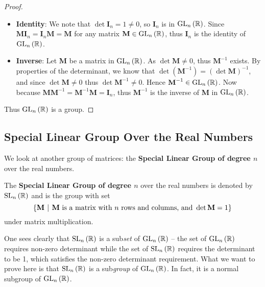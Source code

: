 \begin{proof}
\begin{itemize}
        \item \textbf{Identity}: We note that $\det \textbf{I}_n = 1 \neq 0$, so $\textbf{I}_n$ is in $\mathrm{GL}_{n}\left(\mathbb{R}\right)$. Since $\textbf{MI}_n = \textbf{I}_n\textbf{M} = \textbf{M}$ for any matrix $\textbf{M} \in \mathrm{GL}_{n}\left(\mathbb{R}\right)$, thus $\textbf{I}_n$ is the identity of $\mathrm{GL}_{n}\left(\mathbb{R}\right)$.

        \item \textbf{Inverse}: Let \textbf{M} be a matrix in $\mathrm{GL}_{n}\left(\mathbb{R}\right)$. As $\det \textbf{M} \neq 0$, thus $\textbf{M}^{-1}$ exists. By properties of the determinant, we know that $\det \left(\textbf{M}^{-1}\right) = \left(\det \textbf{M}\right)^{-1}$, and since $\det \textbf{M} \neq 0$ thus $\det \textbf{M}^{-1} \neq 0$. Hence $\textbf{M}^{-1} \in \mathrm{GL}_{n}\left(\mathbb{R}\right)$. Now because $\textbf{MM}^{-1} = \textbf{M}^{-1}\textbf{M} = \textbf{I}_n$, thus $\textbf{M}^{-1}$ is the inverse of \textbf{M} in $\mathrm{GL}_{n}\left(\mathbb{R}\right)$.
    \end{itemize}
    Thus $\mathrm{GL}_{n}\left(\mathbb{R}\right)$ is a group.
\end{proof}

\subsection{Special Linear Group Over the Real Numbers}
We look at another group of matrices: the \textbf{Special Linear Group of degree $n$} over the real numbers.

\begin{definition}
    The \textbf{Special Linear Group of degree $n$} over the real numbers is denoted by $\mathrm{SL}_{n}\left(\mathbb{R}\right)$ and is the group with set
    \[
        \left\{\textbf{M} \vert \text{\textbf{M} is a matrix with } n \text{ rows and columns, and } \det \textbf{M} = 1\right\}
    \]
    under matrix multiplication.
\end{definition}

One sees clearly that $\mathrm{SL}_{n}\left(\mathbb{R}\right)$ is a sub\textit{set} of $\mathrm{GL}_{n}\left(\mathbb{R}\right)$ -- the set of $\mathrm{GL}_{n}\left(\mathbb{R}\right)$ requires non-zero determinant while the set of $\mathrm{SL}_{n}\left(\mathbb{R}\right)$ requires the determinant to be 1, which satisfies the non-zero determinant requirement. What we want to prove here is that $\mathrm{SL}_{n}\left(\mathbb{R}\right)$ is a sub\textit{group} of $\mathrm{GL}_{n}\left(\mathbb{R}\right)$. In fact, it is a normal subgroup of $\mathrm{GL}_{n}\left(\mathbb{R}\right)$.

